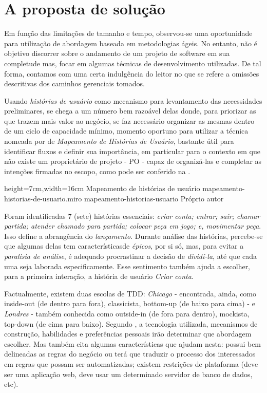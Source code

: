 \section{A proposta de solução}

  Em função das limitações de tamanho e tempo, observou-se uma oportunidade para utilização de abordagem baseada em metodologias ágeis. No entanto, não é objetivo discorrer sobre o andamento de um projeto de software em sua completude mas, focar em algumas técnicas de desenvolvimento utilizadas. De tal forma, contamos com uma certa indulgência do leitor no que se refere a omissões descritivas dos caminhos gerenciais tomados.

  Usando \emph{histórias de usuário} como mecanismo para levantamento das necessidades preliminares, se chega a um número bem razoável delas donde, para priorizar as que trazem mais valor ao negócio, se faz necessário organizar as mesmas dentro de um ciclo de capacidade mínimo, momento oportuno para utilizar a técnica nomeada por  de \emph{Mapeamento de Histórias de Usuário}, bastante útil para identificar fluxos e definir sua importância, em particular para o contexto em que não existe um proprietário de projeto - PO - capaz de organizá-las e completar as intenções firmadas no escopo, como pode ser conferido na .

  \imagem
    {height=7cm,width=16cm}
    {Mapeamento de histórias de usuário}
    {mapeamento-historias-de-usuario.miro}
    {mapeamento-historias-usuario}
    {Próprio autor\footnotemark}

  Foram identificadas 7 (sete) histórias essenciais: \emph{criar conta; entrar; sair; chamar partida; atender chamado para partida; colocar peça em jogo; e, movimentar peça}. Isso define a abrangência do \emph{lançamento}\cite[tradução nossa]{Beck2001}. Durante análise das histórias, percebe-se que algumas delas tem característicasde \emph{épicos}\cite[pág. 6, tradução nossa]{Cohn2004}, por si só, mas, para evitar a \emph{paralisia de análise}\cite[pág. 71, tradução nossa]{Pugh2011}, é adequado procrastinar a decisão de \emph{dividí-la}\cite[pág. 24, tradução nossa]{Cohn2004}, até que cada uma seja laborada especificamente. Esse sentimento também ajuda a escolher, para a primeira interação, a história de usuário \emph{Criar conta}.

  Factualmente, existem duas escolas de TDD: \emph{Chicago} - encontrada, ainda, como inside-out (de dentro para fora), classicista, bottom-up (de baixo para cima) - e \emph{Londres} - também conhecida como outside-in (de fora para dentro), mockista, top-down (de cima para baixo). Segundo , a tecnologia utilizada, mecanismos de construção, habilidades e preferências pessoais irão determinar que abordagem escolher. Mas também cita algumas características que ajudam nesta: possui bem delineadas as regras do negócio ou terá que traduzir o processo dos interessados em regras que possam ser automatizadas; existem restrições de plataforma (deve ser uma aplicação web, deve usar um determinado servidor de banco de dados, etc).

